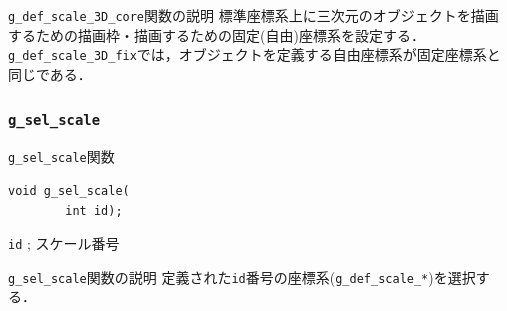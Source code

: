 \documentclass[platex,a4paper,12pt]{jsarticle}%
\begin{document}
\begin{itembox}[l]{\texttt{g\_def\_scale\_3D\_core}関数の説明}
標準座標系上に三次元のオブジェクトを描画するための描画枠・描画するための固定(自由)座標系を設定する．
\verb|g_def_scale_3D_fix|では，オブジェクトを定義する自由座標系が固定座標系と同じである．
\end{itembox}




\clearpage
\subsubsection{\texttt{g\_sel\_scale}}

\begin{itembox}[l]{\texttt{g\_sel\_scale}関数}
\begin{verbatim}
void g_sel_scale(
        int id);
\end{verbatim}
\verb|id| ; スケール番号
\end{itembox}

\begin{itembox}[l]{\texttt{g\_sel\_scale}関数の説明}
定義された\verb|id|番号の座標系(\verb|g_def_scale_*|)を選択する．
\end{itembox}




\end{document}
